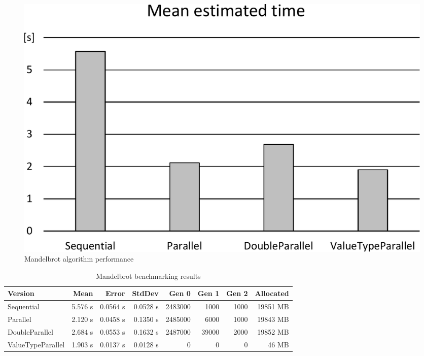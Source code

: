 \begin{figure}[htb]
\centering
\includegraphics[width=.8\linewidth]{figures04/Fig41.pdf}
\caption{Mandelbrot algorithm performance}
\label{fig: MandelbrotPerformance}
\end{figure}


\begin{table}[ht]%
    \centering
    \caption{Mandelbrot benchmarking results}
		\label{tab: MandelbrotBenchmarking}
    \begin{tabularx}{\linewidth}{Xrrrrrrr} \toprule
			\bfseries Version 	&
			\bfseries Mean    	&
			\bfseries Error	    &
			\bfseries StdDev	  &
			\bfseries Gen 0	    &
			\bfseries Gen 1	    &
			\bfseries Gen 2	    &
			\bfseries Allocated \\ \midrule
			Sequential & 5.576 s & 0.0564 s & 0.0528 s & 2483000 & 1000 & 1000 & 19851 MB \\ 
			Parallel & 2.120 s & 0.0458 s & 0.1350 s & 2485000 & 6000 & 1000 & 19843 MB \\ 
			DoubleParallel & 2.684 s & 0.0553 s & 0.1632 s & 2487000 & 39000 & 2000 & 19852 MB \\ 
			ValueTypeParallel & 1.903 s & 0.0137 s & 0.0128 s & 0 & 0 & 0 & 46 MB \\ 
			\bottomrule
	\end{tabularx}
\end{table}


